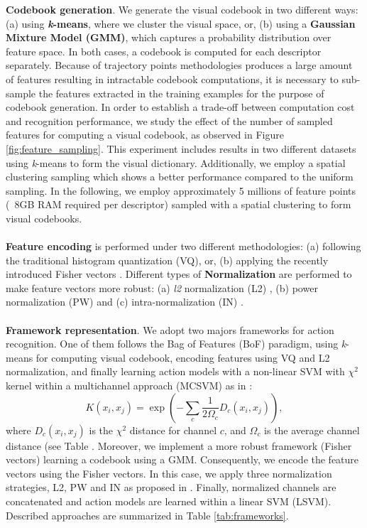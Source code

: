\textbf{Codebook generation}. We generate the visual codebook in two different ways: (a) using \textbf{\textit{k}-means}, where we cluster the visual space, or, (b) using a \textbf{Gaussian Mixture Model (GMM)}, which captures a probability distribution over feature space. In both cases, a codebook is computed for each descriptor separately. Because of trajectory points methodologies produces a large amount of features resulting in intractable codebook computations, it is necessary to sub-sample the features extracted in the training examples for the purpose of codebook generation. In order to establish a trade-off between computation cost and recognition performance, we study the effect of the number of sampled features for computing a visual codebook, as observed in Figure \ref{fig:feature_sampling}. This experiment includes results in two different datasets using \textit{k}-means to form the visual dictionary. Additionally, we employ a spatial clustering sampling  which shows a better performance compared to the uniform sampling. In the following, we employ approximately 5 millions of feature points (~8GB RAM required per descriptor) sampled with a spatial clustering to form visual codebooks.\\\\
\textbf{Feature encoding} is performed under two different methodologies: (a) following the traditional histogram quantization (VQ), or, (b) applying the recently introduced Fisher vectors \cite{perronnin2010}. Different types of \textbf{Normalization} are performed to make feature vectors more robust: (a) \textit{l2} normalization (L2) \cite{perronnin2010}, (b) power normalization (PW) \cite{perronnin2010} and (c) intra-normalization (IN) \cite{xwang2013}. \\\\
\textbf{Framework representation}. We adopt two majors frameworks for action recognition. One of them follows the Bag of Features (BoF) paradigm, using \textit{k}-means for computing visual codebook, encoding features using VQ and L2 normalization, and finally learning action models with a non-linear SVM with $\chi^2$ kernel within a multichannel approach (MCSVM) as in \cite{zhang2007}:
\begin{equation}
K(x_i,x_j)= \exp(-\sum_c {\frac{1}{2\Omega_c} D_c(x_i,x_j)}),
\label{eq:multichannel}
\end{equation}
where $D_c(x_i,x_j)$ is the $\chi^2$ distance for channel $c$, and $\Omega_c$ is the average channel distance (see Table . Moreover, we implement a more robust framework (Fisher vectors) learning a codebook using a GMM. Consequently, we encode the feature vectors using the Fisher vectors. In this case, we apply three normalization strategies, L2, PW and IN as proposed in \cite{xwang2013}. Finally, normalized channels are concatenated and action models are learned within a linear SVM (LSVM). Described approaches are summarized in Table \ref{tab:frameworks}.


